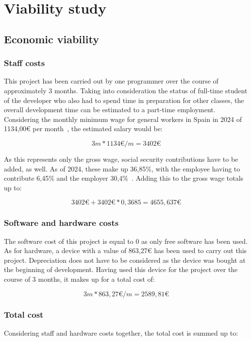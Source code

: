 \section{Viability study}

\subsection{Economic viability}
\subsubsection{Staff costs}
This project has been carried out by one programmer over the course of approximately 3 months. Taking into consideration the status of full-time student of the developer who also had to spend time in preparation for other classes, the overall development time can be estimated to a part-time employment. Considering the monthly minimum wage for general workers in Spain in 2024 of 1134,00€ per month~\cite{minimum_wage_spain_2024}, the estimated salary would be:

\[ 3m * 1134\text{€}/m = 3402\text{€} \]

As this represents only the gross wage, social security contributions have to be added, as well. As of 2024, these make up 36,85\%, with the employee having to contribute 6,45\% and the employer 30,4\%~\cite{spain_taxes}. Adding this to the gross wage totals up to:

\[ 3402\text{€} + 3402\text{€} * 0,3685 = 4655,637\text{€} \]

\subsubsection{Software and hardware costs} \label{software_hardware_costs}
The software cost of this project is equal to 0 as only free software has been used. As for hardware, a device with a value of 863,27€ has been used to carry out this project. Depreciation does not have to be considered as the device was bought at the beginning of development. Having used this device for the project over the course of 3 months, it makes up for a total cost of:

\[ 3m * 863,27\text{€}/m = 2589,81\text{€} \]

\subsubsection{Total cost}
Considering staff and hardware costs together, the total cost is summed up to:

